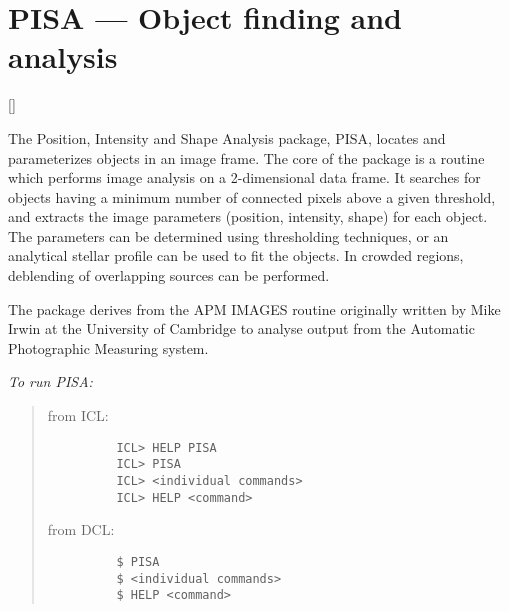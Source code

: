 \newpage

\section{PISA --- Object finding and analysis} 

\vspace{-11mm}

\hfill []

\vspace{5mm}

The Position, Intensity and Shape Analysis package, PISA, locates and
parameterizes objects in an image frame.
The core of the package is a routine which performs image analysis on a
2-dimensional data frame.
It searches for objects having a minimum number of connected pixels above a
given threshold, and extracts the image parameters (position, intensity, shape)
for each object.
The parameters can be determined using thresholding techniques, or an analytical
stellar profile can be used to fit the objects.
In crowded regions, deblending of overlapping sources can be performed.

The package derives from the APM IMAGES routine originally written by Mike
Irwin at the University of Cambridge to analyse output from the Automatic
Photographic Measuring system.

{\em To run PISA:}\hfill
\begin{quote}
\begin{description}

\item [from ICL:]\hfill

\begin{small}
\begin{verbatim}
    ICL> HELP PISA
    ICL> PISA
    ICL> <individual commands>
    ICL> HELP <command>
\end{verbatim}
\end{small}

\item [from DCL:]\hfill

\begin{small}
\begin{verbatim}
    $ PISA
    $ <individual commands>
    $ HELP <command>
\end{verbatim}
\end{small}

\end{description}
\end{quote}

